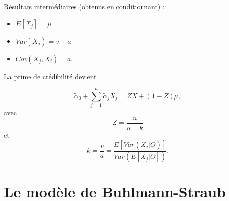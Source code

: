 Résultats intermédiaires (obtenus en conditionnant) :

\begin{itemize}
	\item $\displaystyle E[X_j] = \mu$
	\item $\displaystyle Var(X_j) = v + a$
	\item $\displaystyle Cov(X_j, X_i) = a$.
\end{itemize}

La prime de crédibilité devient

$$\tilde{\alpha}_0 + \sum_{j = 1}^{n}\tilde{\alpha}_jX_j = Z\overline{X} + (1-Z)\mu,$$
avec
$$Z = \frac{n}{n + k}$$
et
$$k = \frac{v}{a} = \frac{E[Var(X_j \vert \Theta)]}{Var(E[X_j \vert \Theta])}.$$

\chapter{Le modèle de Buhlmann-Straub}


















